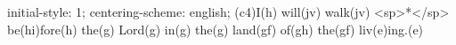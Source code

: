 initial-style: 1;
centering-scheme: english;
(c4)I(h) will(jv) walk(jv) <sp>*</sp> be(hi)fore(h) the(g) Lord(g) in(g) the(g) land(gf) of(gh) the(gf) liv(e)ing.(e)
